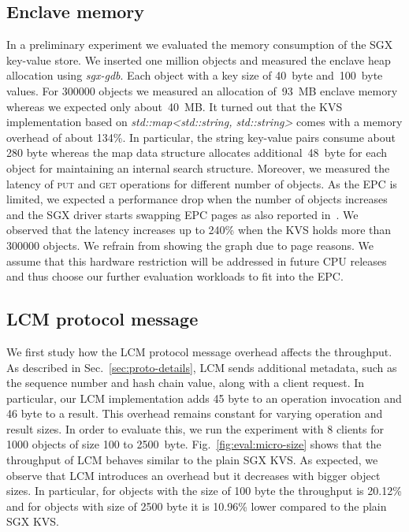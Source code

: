 \documentclass[11pt]{article}
\theoremstyle{plain-boldhead}
\theoremstyle{definition-boldhead}
\newcommand{\str}[1]{\textsc{#1}}
\newcommand{\pp}{LCM\xspace}
\begin{document}
\subsection{Enclave memory}

In a preliminary experiment we evaluated the memory consumption of the \ac{SGX}
key-value store.  We inserted one million objects and measured
the enclave heap allocation using \emph{sgx-gdb}.  Each object with a key size
of 40~byte and~100~byte values.
% 
For 300000 objects we measured an allocation of~93~MB enclave memory whereas
we expected only about~40~MB.  It turned out that the KVS implementation based
on \emph{std::map<std::string, std::string>} comes with a memory overhead of
about 134\%.  In particular, the string key-value pairs consume about 280 byte
whereas the map data structure allocates additional~48~byte for each object
for maintaining an internal search structure. 
% 
Moreover, we measured the latency of \str{put} and \str{get} operations for
different number of objects.  As the EPC is limited, we expected a performance
drop when the number of objects increases and the \ac{SGX} driver starts swapping
EPC pages as also reported in~\cite{scone-osdi16,mw16seckeeper}. We observed
that the latency increases up to 240\% when the KVS holds more than 300000
objects.
% 
We refrain from showing the graph due to page reasons.
% 
We assume that this hardware restriction will be addressed in future CPU releases 
and thus choose our further evaluation workloads to fit into the EPC. 


\subsection{\pp protocol message}

We first study how the LCM protocol message overhead affects the throughput.
As described in Sec.~\ref{sec:proto-details}, LCM sends additional
metadata, such as the sequence number and hash chain value, along
with a client request.  In particular, our LCM implementation adds 45 byte to
an operation invocation and 46 byte to a result.  This overhead remains
constant for varying operation and result sizes.
% 
In order to evaluate this, we run the experiment with 8 clients for 1000
objects of size 100 to 2500~byte. Fig.~\ref{fig:eval:micro-size} shows that
the throughput of \pp behaves similar to the plain \ac{SGX} KVS.  As expected, we
observe that \pp introduces an overhead but it decreases with bigger object
sizes. In particular, for objects with the size of 100 byte the throughput is
20.12\% and for objects with size of 2500 byte it is 10.96\%  lower compared
to the plain \ac{SGX} KVS. 
\end{document}
